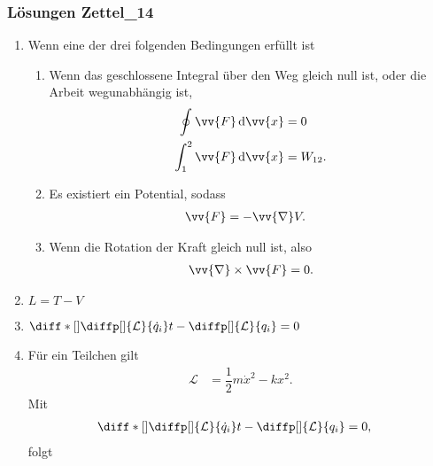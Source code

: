 \documentclass[a4paper,12pt]{article}
\newcommand{\td}{\,\text{d}}
\numberwithin{equation}{section}
\begin{document}
\newpage
\subsubsection{Lösungen Zettel\_14}
\begin{enumerate}[label=\arabic*.]
        \item Wenn eine der drei folgenden Bedingungen erfüllt ist
                \begin{enumerate}[label=\alph*)]
                        \item Wenn das geschlossene Integral über den Weg gleich null ist, oder die Arbeit wegunabhängig ist,
                                \begin{align*} 
                                        \oint_{}^{}\vv{F}\td \vv{x}&=0\\
                                        \int_{1}^{2}\vv{F}\td \vv{x}&=W_{12}
                                .\end{align*} 
                        \item Es existiert ein Potential, sodass 
                                \begin{align*} 
                                        \vv{F}&=-\vv{\nabla }V
                                .\end{align*} 
                        \item Wenn die Rotation der Kraft gleich null ist, also
                                \begin{align*} 
                                        \vv{\nabla }\times \vv{F}=0
                                .\end{align*} 
                \end{enumerate}
        \item $L=T-V$
        \item $\diff*[]{\diffp[]{\mathcal{L}}{\dot{q}_i}}{t}-\diffp[]{\mathcal{L}}{q_i}=0$
        \item Für ein Teilchen gilt
                \begin{align*} 
                        \mathcal{L}&=\dfrac{1}{2}m\dot{x}^2-kx^2
                .\end{align*} 
                Mit \begin{align*} 
                        \diff*[]{\diffp[]{\mathcal{L}}{\dot{q}_i}}{t}-\diffp[]{\mathcal{L}}{q_i}&=0
                ,\end{align*} 
                folgt
                \begin{align*} 

\end{align*}
\end{enumerate}
\end{document}
